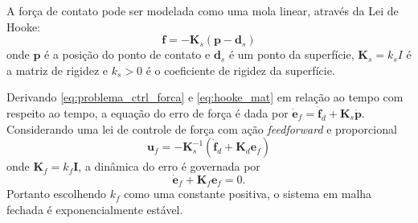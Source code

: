 A força de contato pode ser modelada como uma mola linear, através da Lei de Hooke:
\begin{equation} \label{eq:hooke_mat}
\bm{f} = -\bm{K}_s (\bm{p} - \bm{d}_s)
\end{equation}
onde $\bm{p}$ é a posição do ponto de contato e $\bm{d}_s$ é um ponto da superfície, $\bm{K}_s = k_s I$ é a matriz de rigidez e $k_s > 0$ é o coeficiente de rigidez da superfície.

Derivando \eqref{eq:problema_ctrl_forca} e \eqref{eq:hooke_mat} em relação ao tempo com respeito ao tempo, a equação do erro de força é dada por $\dot{\bm{e}}_f = \dot{\bm{f}}_d + \bm{K}_s \dot{\bm{p}}$. Considerando uma lei de controle de força com ação \textit{feedforward} e proporcional
\begin{equation}
\bm{u}_f = -\bm{K}_s^{-1} (\dot{\bm{f}}_d + \bm{K}_d\bm{e}_f)
\end{equation}
onde $\bm{K}_f = k_f \bm{I}$, a dinâmica do erro é governada por
\begin{equation}
\dot{\bm{e}}_f + \bm{K}_f \bm{e}_f = 0.
\end{equation}
Portanto escolhendo $k_f$ como uma constante positiva, o sistema em malha fechada é exponencialmente estável. 